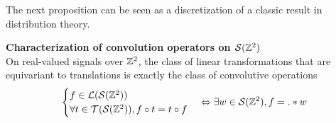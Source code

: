 The next proposition can be seen as a discretization of a classic result in distribution theory.

\begin{proposition}\textbf{Characterization of convolution operators on $\mathcal{S}(\mathbb{Z}^2)$}\\
On real-valued signals over $\mathbb{Z}^2$, the class of linear transformations that are equivariant to translations is exactly the class of convolutive operations \ie
\begin{gather*}
\begin{cases}
 f \in \mathcal{L}(\mathcal{S}(\mathbb{Z}^2))\\
 \forall t \in \mathcal{T}(\mathcal{S}(\mathbb{Z}^2)), f \circ t = t \circ f
\end{cases}
 \Leftrightarrow \exists w \in \mathcal{S}(\mathbb{Z}^2), f = . \ast w
\end{gather*}
\label{prop:equi}
\end{proposition}

